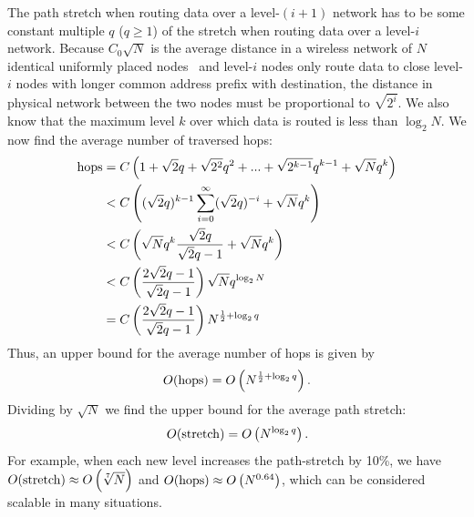 \documentclass[conference]{IEEEtran}
\theoremstyle{definition}
\begin{document}
The path stretch when routing data over a level-$(i+1)$ network has to be some constant multiple $q$ ($q \ge 1$) of the stretch when routing data over a level-$i$ network. Because $C_0\sqrt{N}$ is the average distance in a wireless network of $N$ identical uniformly placed nodes~\cite{Kleinrock} and level-$i$ nodes only route data to close level-$i$ nodes with longer common address prefix with destination, the distance in physical network between the two nodes must be proportional to $\sqrt{2^i}$. We also know that the maximum level $k$ over which data is routed is less than $\log_2N$. We now find the average number of traversed hops:
\begin{equation*}
\begin{split}
    {\rm hops} & = C \left (1 + \sqrt{2} q + \sqrt{2^2} q^2  + ... + \sqrt{2^{k-1}} q^{k-1} + \sqrt{N} q^k \right ) \\
              & < C \left( (\sqrt{2} q)^{k-1} \sum_{i = 0}^{\infty} (\sqrt{2}q)^{-i} + \sqrt{N} q^k \right ) \\
               & < C \left ( \sqrt{N} q^k \frac{\sqrt{2} q}{\sqrt{2}q - 1} + \sqrt{N} q^k \right )  \\
               & < C \left ( \frac{2\sqrt{2}q - 1}{\sqrt{2}q - 1} \right ) \sqrt{N} q^{\log_2 N}  \\
               & = C \left ( \frac{2\sqrt{2}q - 1}{\sqrt{2}q - 1} \right ) N^{\frac{1}{2} + \log_2 q}
\end{split}
\end{equation*}
Thus, an upper bound for the average number of hops is given by
\begin{equation*}
    O({\rm hops}) = O \left ( N^{\frac{1}{2} + \log_2 q} \right ) .
\end{equation*}
Dividing by $\sqrt{N}$ we find the upper bound for the average path stretch:
\begin{equation*}
    O({\rm stretch}) = O \left ( N^{\log_2 q} \right ) .
\end{equation*}
For example, when each new level increases the path-stretch by 10\%, we have $O({\rm stretch}) \approx O \left ( \sqrt[7]{N} \right )$ and $O({\rm hops}) \approx O \left ( N^{0.64} \right )$, which can be considered scalable in many situations. 
\end{document}
